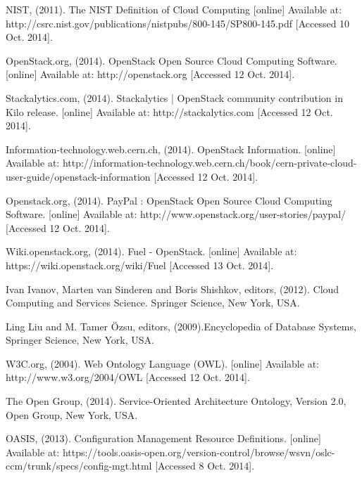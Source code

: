 


\newblock NIST, (2011). The NIST Definition of Cloud Computing [online] Available at: http://csrc.nist.gov/publications/nistpubs/800-145/SP800-145.pdf [Accessed 10 Oct. 2014].

\newblock OpenStack.org, (2014). OpenStack Open Source Cloud Computing Software. [online] Available at: http://openstack.org [Accessed 12 Oct. 2014].

\newblock  Stackalytics.com, (2014). Stackalytics | OpenStack community contribution in Kilo release. [online] Available at: http://stackalytics.com [Accessed 12 Oct. 2014].

\newblock  Information-technology.web.cern.ch, (2014). OpenStack Information. [online] Available at: http://information-technology.web.cern.ch/book/cern-private-cloud-user-guide/openstack-information [Accessed 12 Oct. 2014].

\newblock Openstack.org, (2014). PayPal : OpenStack Open Source Cloud Computing Software. [online] Available at: http://www.openstack.org/user-stories/paypal/ [Accessed 12 Oct. 2014].

\newblock Wiki.openstack.org, (2014). Fuel - OpenStack. [online] Available at: https://wiki.openstack.org/wiki/Fuel [Accessed 13 Oct. 2014].

\newblock Ivan Ivanov, Marten van Sinderen and Boris Shishkov, editors, (2012). Cloud Computing and Services Science. Springer Science, New York, USA.


\newblock Ling Liu and M. Tamer Özsu, editors, (2009).Encyclopedia of Database Systems, Springer Science, New York, USA.

\newblock W3C.org, (2004). Web Ontology Language (OWL). [online] Available at:  http://www.w3.org/2004/OWL [Accessed 12 Oct. 2014].

\newblock The Open Group, (2014). Service-Oriented Architecture Ontology, Version 2.0, Open Group, New York, USA.

\newblock OASIS, (2013). Configuration Management Resource Definitions. [online] Available at: https://tools.oasis-open.org/version-control/browse/wsvn/oslc-ccm/trunk/specs/config-mgt.html [Accessed 8 Oct. 2014].

